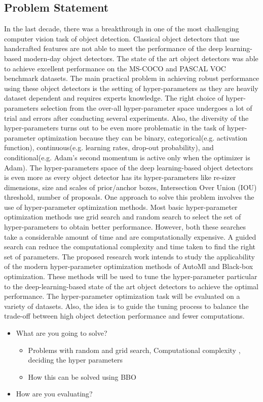 \documentclass[thesis]{mas_proposal}
\begin{document}

\subsection{Problem Statement}
 In the last decade, there was a breakthrough in one of the most challenging computer vision task of object detection. Classical object detectors that use handcrafted features are not able to meet the performance of the deep learning-based modern-day object detectors. The state of the art object detectors was able to achieve excellent performance on the MS-COCO and PASCAL VOC benchmark datasets. The main practical problem in achieving robust performance using these object detectors is the setting of hyper-parameters as they are heavily dataset dependent and requires experts knowledge. The right choice of hyper-parameters selection from the over-all hyper-parameter space undergoes a lot of trial and errors after conducting several experiments. Also, the diversity of the hyper-parameters turns out to be even more problematic in the task of hyper-parameter optimization because they can be binary, categorical(e.g. activation function), continuous(e.g. learning rates, drop-out probability),  and conditional(e.g. Adam's second momentum is active only when the optimizer is Adam).  The hyper-parameters space of the deep learning-based object detectors is even more as every object detector has its hyper-parameters like re-sizer dimensions, size and scales of prior/anchor boxes, Intersection Over Union (IOU) threshold, number of proposals. One approach to solve this problem involves the use of hyper-parameter optimization methods. Most basic hyper-parameter optimization methods use grid search and random search to select the set of hyper-parameters to obtain better performance. However, both these searches take a considerable amount of time and are computationally expensive. A guided search can reduce the computational complexity and time taken to find the right set of parameters.
 The proposed research work intends to study the applicability of the modern hyper-parameter optimization methods of AutoMl and Black-box optimization. These methods will be used to tune the hyper-parameter particular to the deep-learning-based state of the art object detectors to achieve the optimal performance.  The hyper-parameter optimization task will be evaluated on a variety of datasets. Also, the idea is to guide the tuning process to balance the trade-off between high object detection performance and fewer computations.
\begin{itemize}
    \item What are you going to solve?
    \begin{itemize}
        \item Problems with random and grid search, Computational complexity , deciding the hyper parameters
        \item How this can be solved using BBO
    \end{itemize}
    \item How are you evaluating?
\end{itemize}
\end{document}
